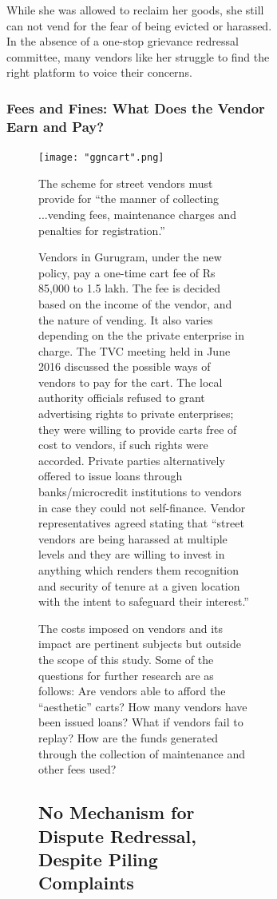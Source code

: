\documentclass[a4paper, 12pt, twoside]{article}
\begin{document}
\begin{figure}
{\begin{figure}
\begin{mdframed}[backgroundcolor=gray!20]

While she was allowed to reclaim her goods, she still can not vend for the fear of being evicted or harassed. In the absence of a one-stop grievance redressal committee, many vendors like her struggle to find the right platform to voice their concerns.
\end{mdframed}



\subsubsection*{Fees and Fines: What Does the Vendor Earn and Pay?}

\begin{figure}
\centering
\texttt{[image: "ggncart".png]}

The scheme for street vendors must provide for “the manner of collecting ...vending fees, maintenance charges and penalties for registration.”

Vendors in Gurugram, under the new policy, pay a one-time cart fee of Rs 85,000 to 1.5 lakh. The fee is decided based on the income of the vendor, and the nature of vending. It also varies depending on the the private enterprise in charge. The TVC meeting held in June 2016 discussed the possible ways of vendors to pay for the cart. The local authority officials refused to grant advertising rights to private enterprises; they were willing to provide carts free of cost to vendors, if such rights were accorded. Private parties alternatively offered to issue loans through banks/microcredit institutions to vendors in case they could not self-finance. Vendor representatives agreed stating that “street vendors are being harassed at multiple levels and they are willing to invest in anything which renders them recognition and security of tenure at a given location with the intent to safeguard their interest.”



The costs imposed on vendors and its impact are pertinent subjects but outside the scope of this study. Some of the questions for further research are as follows: Are vendors able to afford the “aesthetic” carts? How many vendors have been issued loans? What if vendors fail to replay? How are the funds generated through the collection of maintenance and other fees used?

\subsection*{No Mechanism for Dispute Redressal, Despite Piling Complaints}






\end{figure}
\end{figure}}
\end{figure}
\end{document}
